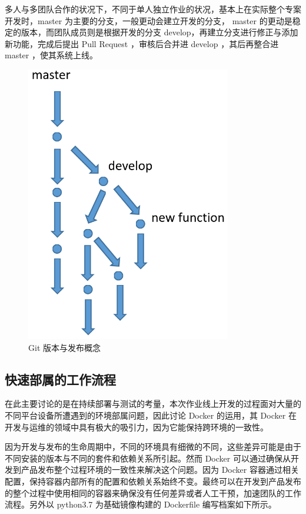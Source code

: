 多人与多团队合作的状况下，不同于单人独立作业的状况，基本上在实际整个专案开发时，master 为主要的分支，一般更动会建立开发的分支， master 的更动是稳定的版本，而团队成员则是根据开发的分支 develop，再建立分支进行修正与添加新功能，完成后提出 Pull Request ，审核后合并进 develop ，其后再整合进 master ，使其系统上线。

\begin{figure}[htb]
\centering 
\includegraphics[width=0.80\textwidth]{img/ch5m2.png} 
\caption{Git 版本与发布概念}
\label{Test}
\end{figure}

\subsection{快速部属的工作流程}

在此主要讨论的是在持续部署与测试的考量，本次作业线上开发的过程面对大量的不同平台设备所遭遇到的环境部属问题，因此讨论 Docker 的运用，其 Docker 在开发与运维的领域中具有极大的吸引力，因为它能保持跨环境的一致性。

因为开发与发布的生命周期中，不同的环境具有细微的不同，这些差异可能是由于不同安装的版本与不同的套件和依赖关系所引起。然而 Docker 可以通过确保从开发到产品发布整个过程环境的一致性来解决这个问题。因为 Docker 容器通过相关配置，保持容器内部所有的配置和依赖关系始终不变。最终可以在开发到产品发布的整个过程中使用相同的容器来确保没有任何差异或者人工干预，加速团队的工作流程。另外以 python3.7 为基础镜像构建的 Dockerfile 编写档案如下所示。

